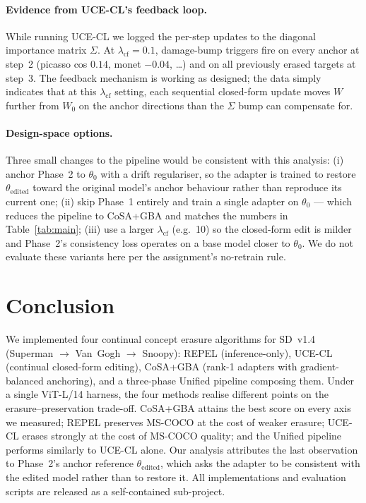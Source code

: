 \documentclass[10pt,twocolumn,letterpaper]{article}
\begin{document}
\paragraph{Evidence from UCE-CL's feedback loop.} While running
UCE-CL we logged the per-step updates to the diagonal importance
matrix $\Sigma$. At $\lambda_\text{cf}{=}0.1$, damage-bump triggers
fire on every anchor at step~2 (picasso cos $0.14$, monet $-0.04$,
\dots) and on all previously erased targets at step~3. The feedback
mechanism is working as designed; the data simply indicates that at
this $\lambda_\text{cf}$ setting, each sequential closed-form update
moves $W$ further from $W_0$ on the anchor directions than the
$\Sigma$ bump can compensate for.

\paragraph{Design-space options.} Three small changes to the pipeline
would be consistent with this analysis:
(i) anchor Phase~2 to $\theta_0$ with a drift regulariser, so the
adapter is trained to restore $\theta_\text{edited}$ toward the
original model's anchor behaviour rather than reproduce its current
one;
(ii) skip Phase~1 entirely and train a single adapter on $\theta_0$ ---
which reduces the pipeline to CoSA+GBA and matches the numbers in
Table~\ref{tab:main};
(iii) use a larger $\lambda_\text{cf}$ (e.g.\ 10) so the closed-form
edit is milder and Phase~2's consistency loss operates on a base model
closer to $\theta_0$. We do not evaluate these variants here per the
assignment's no-retrain rule.

\section{Conclusion}
We implemented four continual concept erasure algorithms for SD~v1.4
(Superman $\rightarrow$ Van~Gogh $\rightarrow$ Snoopy): REPEL
(inference-only), UCE-CL (continual closed-form editing), CoSA+GBA
(rank-1 adapters with gradient-balanced anchoring), and a three-phase
Unified pipeline composing them. Under a single ViT-L/14 harness, the
four methods realise different points on the erasure--preservation
trade-off. CoSA+GBA attains the best score on every axis we measured;
REPEL preserves MS-COCO at the cost of weaker erasure; UCE-CL erases
strongly at the cost of MS-COCO quality; and the Unified pipeline
performs similarly to UCE-CL alone. Our analysis attributes the last
observation to Phase~2's anchor reference
$\theta_\text{edited}$, which asks the adapter to be consistent with
the edited model rather than to restore it. All implementations and
evaluation scripts are released as a self-contained sub-project.

{\small


}
\end{document}
